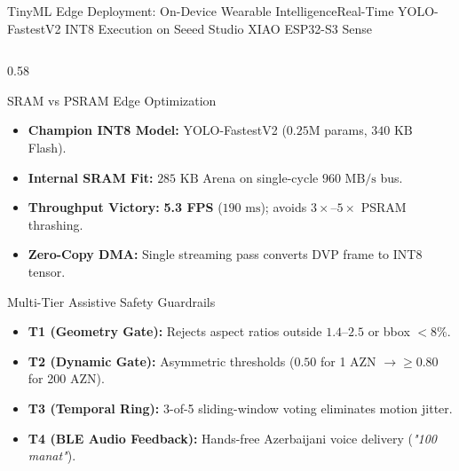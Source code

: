 \begin{frame}{TinyML Edge Deployment: On-Device Wearable Intelligence}{Real-Time YOLO-FastestV2 INT8 Execution on Seeed Studio XIAO ESP32-S3 Sense}
\begin{columns}[c]
        \begin{column}{0.58\textwidth}
            \begin{techblock}{SRAM vs PSRAM Edge Optimization}
                \scriptsize
                \begin{itemize}\setlength{\itemsep}{1.5pt}
                    \item \textbf{Champion INT8 Model:} YOLO-FastestV2 ($0.25\text{M}$ params, $340\text{ KB}$ Flash).
                    \item \textbf{Internal SRAM Fit:} $285\text{ KB}$ Arena on single-cycle $960\text{ MB/s}$ bus.
                    \item \textbf{Throughput Victory:} \textbf{5.3 FPS} ($190\text{ ms}$); avoids $3\times\text{--}5\times$ PSRAM thrashing.
                    \item \textbf{Zero-Copy DMA:} Single streaming pass converts DVP frame to INT8 tensor.
                \end{itemize}
            \end{techblock}
            
            \vspace{0.08cm}
            \begin{alertblockcustom}{Multi-Tier Assistive Safety Guardrails}
                \scriptsize
                \begin{itemize}\setlength{\itemsep}{1.5pt}
                    \item \textbf{T1 (Geometry Gate):} Rejects aspect ratios outside $1.4\text{--}2.5$ or bbox $<8\%$.
                    \item \textbf{T2 (Dynamic Gate):} Asymmetric thresholds ($0.50$ for 1 AZN $\to \ge 0.80$ for 200 AZN).
                    \item \textbf{T3 (Temporal Ring):} 3-of-5 sliding-window voting eliminates motion jitter.
                    \item \textbf{T4 (BLE Audio Feedback):} Hands-free Azerbaijani voice delivery (\textit{"100 manat"}).
                \end{itemize}
            \end{alertblockcustom}
        \end{column}
    \end{columns}
\end{frame}
